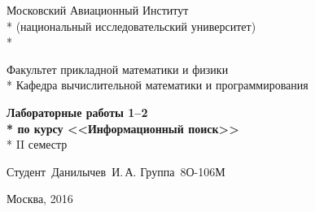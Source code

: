 \begin{titlepage}

\newpage

\begin{center}
Московский Авиационный Институт \\*
(национальный исследовательский университет) \\*

\vspace{2em}

Факультет прикладной математики и физики \\*
Кафедра вычислительной математики и программирования

\vspace{20em}

\Large \textbf{Лабораторные работы 1--2 \\*
по курсу <<Информационный поиск>>} \\*
II семестр

\end{center}

\vspace{15em}

\hspace{30em}\vbox{
	\hbox{Студент Данилычев И.\,А.}
	\hbox{Группа 8О-106М}
}

\vspace{\fill}

\begin{center}
Москва, 2016
\end{center}

\end{titlepage}